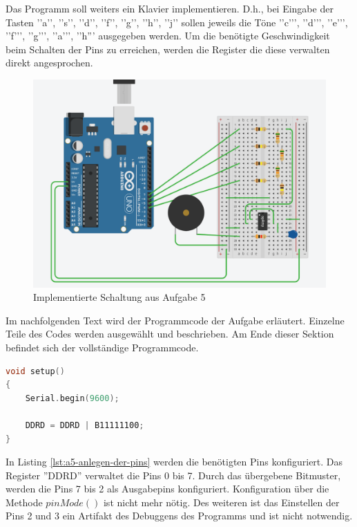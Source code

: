 Das Programm soll weiters ein Klavier implementieren.
D.h., bei Eingabe der Tasten ’’a’’, ’’s’’, ’’d’’, ’’f’’, ’’g’’, ’’h’’, ’’j’’ sollen jeweils die Töne ’’c'’’, ’’d'’’, ’’e'’’, ’’f'’’, ’’g'’’, ’’a'’’, ’’h''' ausgegeben werden.
Um die benötigte Geschwindigkeit beim Schalten der Pins zu erreichen, werden die Register die diese verwalten direkt angesprochen.

\begin{figure}[h]
    \centering
    \includegraphics[width=\textwidth]{pictures/a5-praktik.png}
    \caption{Implementierte Schaltung aus Aufgabe 5}
    \label{fig:a5-praktik}
\end{figure}

Im nachfolgenden Text wird der Programmcode der Aufgabe erläutert.
Einzelne Teile des Codes werden ausgewählt und beschrieben.
Am Ende dieser Sektion befindet sich der vollständige Programmcode.

\begin{lstlisting}[language=C,label={lst:a5-anlegen-der-pins}, caption={Anlegen der Pins über Register}]
void setup()
{
    Serial.begin(9600);

    DDRD = DDRD | B11111100;
}
\end{lstlisting}

In Listing \ref{lst:a5-anlegen-der-pins} werden die benötigten Pins konfiguriert.
Das Register ''DDRD'' verwaltet die Pins 0 bis 7.
Durch das übergebene Bitmuster, werden die Pins 7 bis 2 als Ausgabepins konfiguriert.
Konfiguration über die Methode $pinMode()$ ist nicht mehr nötig.
Des weiteren ist das Einstellen der Pins 2 und 3 ein Artifakt des Debuggens des Programms und ist nicht notwendig.

